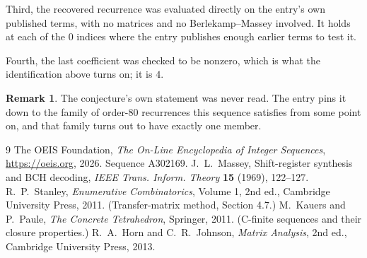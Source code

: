 \documentclass[11pt,a4paper]{article}
\theoremstyle{plain}
\theoremstyle{definition}
\newtheorem{remark}[theorem]{Remark}
\begin{document}
Third, the recovered recurrence was evaluated directly on the entry's own published terms, with
no matrices and no Berlekamp--Massey involved. It holds at each of the $0$ indices where
the entry publishes enough earlier terms to test it.

Fourth, the last coefficient was checked to be nonzero, which is what the identification above
turns on; it is $4$.

\begin{remark}
The conjecture's own statement was never read. The entry pins it down to the family of
order-$80$ recurrences this sequence satisfies from some point on, and that family turns
out to have exactly one member.
\end{remark}

\begin{thebibliography}{9}
 The OEIS Foundation, \emph{The On-Line Encyclopedia of Integer
Sequences}, \url{https://oeis.org}, 2026. Sequence A302169.
 J.~L.~Massey, Shift-register synthesis and BCH decoding, \emph{IEEE
Trans. Inform. Theory} \textbf{15} (1969), 122--127.
 R.~P.~Stanley, \emph{Enumerative Combinatorics}, Volume 1, 2nd ed.,
Cambridge University Press, 2011. (Transfer-matrix method, Section 4.7.)
 M.~Kauers and P.~Paule, \emph{The Concrete Tetrahedron}, Springer, 2011.
(C-finite sequences and their closure properties.)
 R.~A.~Horn and C.~R.~Johnson, \emph{Matrix Analysis}, 2nd ed., Cambridge
University Press, 2013.
\end{thebibliography}
\end{document}
